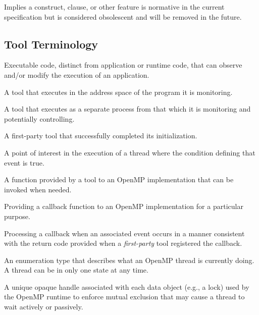 \glossarydefstart
Implies a construct, clause, or other feature is normative in the current specification but is considered obsolescent and will be removed in the future.
\glossarydefend

\subsection{Tool Terminology}

\glossarydefstart
Executable code, distinct from application or runtime code, that can observe and/or modify the execution of an application.
\glossarydefend

\glossarydefstart
A tool that executes in the address space of the program it is monitoring.
\glossarydefend

\glossarydefstart
A tool that executes as a separate process from that which it is monitoring and potentially controlling.
\glossarydefend

\glossarydefstart
A first-party tool that successfully completed its initialization.
\glossarydefend

\glossarydefstart
A point of interest in the execution of a thread where the condition
defining that event is true. 
\glossarydefend

\glossarydefstart
A function provided by a tool to an OpenMP implementation that can be invoked when needed.
\glossarydefend

\glossarydefstart
Providing a callback function to an OpenMP implementation for a particular purpose.
\glossarydefend

\glossarydefstart
Processing a callback when an associated event occurs in a manner consistent with the return code
provided when a \emph{first-party} tool registered the callback.
\glossarydefend

\glossarydefstart
An enumeration type that describes what an OpenMP thread is currently doing.  
A thread can be in only one state at any time.
\glossarydefend

\glossarydefstart
A unique opaque handle associated with each data object (e.g., a lock) used by the OpenMP runtime
to enforce mutual exclusion that may cause a thread to wait actively or passively.
\glossarydefend

